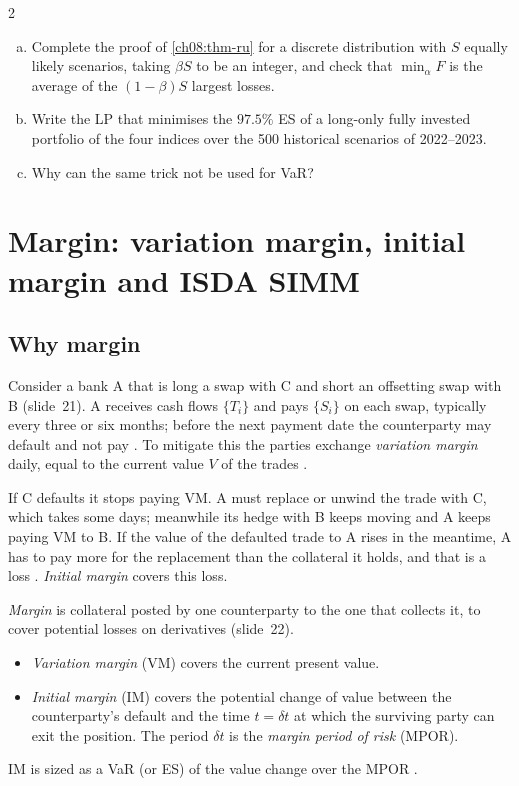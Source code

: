 \begin{paracol}{2}
\begin{exercise}
\leavevmode
\begin{enumerate}[(a)]
  \item Complete the proof of \cref{ch08:thm-ru} for a discrete distribution with $S$ equally likely scenarios, taking
      $\beta S$ to be an integer, and check that $\min_\alpha F$ is the average of the $(1-\beta)S$ largest losses.
  \item Write the LP that minimises the $97.5\%$ ES of a long-only fully invested portfolio of the four indices over the
      500 historical scenarios of 2022--2023.
  \item Why can the same trick not be used for VaR?
\end{enumerate}
\end{exercise}

\section{Margin: variation margin, initial margin and ISDA SIMM}\label{ch08:sec-margin}

\subsection{Why margin}
Consider a bank A that is long a swap with C and short an offsetting swap with B (slide~21). A receives cash flows
$\{T_i\}$ and pays $\{S_i\}$ on each swap, typically every three or six months; before the next payment date the
counterparty may default and not pay . To mitigate this the parties exchange \emph{variation
margin} daily, equal to the current value $V$ of the trades .

If C defaults it stops paying VM. A must replace or unwind the trade with C, which takes some days; meanwhile its
hedge with B keeps moving and A keeps paying VM to B. If the value of the defaulted trade to A rises in the
meantime, A has to pay more for the replacement than the collateral it holds, and that is a loss
. \emph{Initial margin} covers this loss.

\begin{definition}[Margin]
\emph{Margin} is collateral posted by one counterparty to the one that collects it, to cover potential losses on
derivatives (slide~22).
\begin{itemize}
  \item \emph{Variation margin} (VM) covers the current present value.
  \item \emph{Initial margin} (IM) covers the potential change of value between the counterparty's default and the
        time $t=\delta t$ at which the surviving party can exit the position. The period $\delta t$ is the
        \emph{margin period of risk} (MPOR).
\end{itemize}
IM is sized as a VaR (or ES) of the value change over the MPOR .
\end{definition}


\end{paracol}
